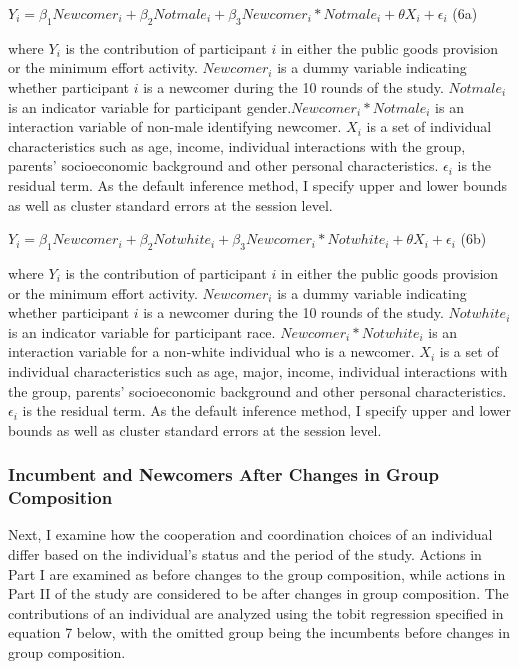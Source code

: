 \begin{center}
 $ Y_{i} = \beta_1 Newcomer_{i} + \beta_2 Notmale_{i} + \beta_3 Newcomer_{i}*Notmale_{i} + \theta X_{i} + \epsilon_{i}  $  \space   (6a)
\end{center}

 \noindent where $Y_{i}$ is the contribution of participant $i$ in either the public goods provision or the minimum effort activity. $Newcomer_{i}$ is a dummy variable indicating whether participant $i$ is a newcomer during the 10 rounds of the study. $Notmale_{i}$ is an indicator variable for participant gender.$Newcomer_{i}*Notmale_{i}$ is an interaction variable of non-male identifying newcomer. $X_{i}$ is a set of individual characteristics such as age, income, individual interactions with the group, parents' socioeconomic background and other personal characteristics. $\epsilon_{i}$ is the residual term. As the default inference method, I specify upper and lower bounds as well as cluster standard errors at the session level.

\begin{center}
 $ Y_{i} = \beta_1 Newcomer_{i} + \beta_2 Notwhite_{i} + \beta_3 Newcomer_{i}*Notwhite_{i} + \theta X_{i} + \epsilon_{i}  $  \space  (6b)
\end{center}

 \noindent where $Y_{i}$ is the contribution of participant $i$ in either the public goods provision or the minimum effort activity. $Newcomer_{i}$ is a dummy variable indicating whether participant $i$ is a newcomer during the 10 rounds of the study.  $Notwhite_{i}$ is an indicator variable for participant race. $Newcomer_{i}*Notwhite_{i}$ is an interaction variable for a non-white individual who is a newcomer. $X_{i}$ is a set of individual characteristics such as age, major, income, individual interactions with the group, parents' socioeconomic background and other personal characteristics. $\epsilon_{i}$ is the residual term. As the default inference method, I specify upper and lower bounds as well as cluster standard errors at the session level.

\subsubsection{Incumbent and Newcomers After Changes in Group Composition}

Next, I examine how the cooperation and coordination choices of an individual differ based on the individual's status and the period of the study.  Actions in Part I are examined as before changes to the group composition, while actions in Part II of the study are considered to be after changes in group composition. The contributions of an individual are analyzed using the tobit regression specified in equation 7 below, with the omitted group being the incumbents before changes in group composition.

